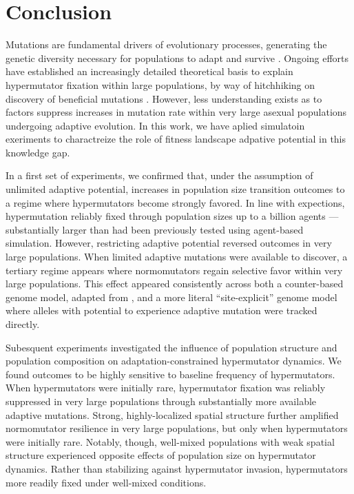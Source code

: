 \section{Conclusion} \label{sec:conclusion}

Mutations are fundamental drivers of evolutionary processes, generating the genetic diversity necessary for populations to adapt and survive \citep{hershberg2015mutation}.
Ongoing efforts have established an increasingly detailed theoretical basis to explain hypermutator fixation within large populations, by way of hitchhiking on discovery of beneficial mutations \citep{TODO}.
However, less understanding exists as to factors suppress increases in mutation rate within very large asexual populations undergoing adaptive evolution.
In this work, we have aplied simulatoin exeriments to charactreize the role of fitness landscape adpative potential in this knowledge gap.

In a first set of experiments, we confirmed that, under the assumption of unlimited adaptive potential, increases in population size transition outcomes to a regime where hypermutators become strongly favored.
In line with expections, hypermutation reliably fixed through population sizes up to a billion agents --- substantially larger than had been previously tested using agent-based simulation.
However, restricting adaptive potential reversed outcomes in very large populations.
When limited adaptive mutations were available to discover, a tertiary regime appears where normomutators regain selective favor within very large populations.
This effect appeared consistently across both a counter-based genome model, adapted from \citet{raynes2018sign}, and a more literal ``site-explicit'' genome model where alleles with potential to experience adaptive mutation were tracked directly.

Subesquent experiments investigated the influence of population structure and population composition on adaptation-constrained hypermutator dynamics.
We found outcomes to be highly sensitive to baseline frequency of hypermutators.
When hypermutators were initially rare, hypermutator fixation was reliably suppressed in very large populations through substantially more available adaptive mutations.
Strong, highly-localized spatial structure further amplified normomutator resilience in very large populations, but only when hypermutators were initially rare.
Notably, though, well-mixed populations with weak spatial structure experienced opposite effects of population size on hypermutator dynamics.
Rather than stabilizing against hypermutator invasion, hypermutators more readily fixed under well-mixed conditions.

